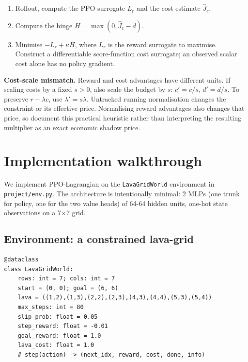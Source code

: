 \documentclass[11pt,oneside]{scrbook}
\begin{document}
\begin{tcolorbox}[colback=mintedbg, colframe=rlgray!50, title=\textbf{Algorithm: P3O (one update)}]
\begin{enumerate}[leftmargin=*]
  \item Rollout, compute the PPO surrogate $L_r$ and the cost estimate
        $\hat J_c$.
  \item Compute the hinge $H = \max(0, \hat J_c - d)$.
  \item Minimise $-L_r + \kappa H$, where $L_r$ is the reward surrogate to maximise. Construct a differentiable score-function cost surrogate; an observed scalar cost alone has no policy gradient.
\end{enumerate}
\end{tcolorbox}

\begin{pitfall}
\textbf{Cost-scale mismatch.} Reward and cost advantages have different
units. If scaling costs by a fixed $s>0$, also scale the budget by $s$:
$c'=c/s$, $d'=d/s$. To preserve $r-\lambda c$, use $\lambda'=s\lambda$.
Untracked running normalisation changes the constraint or its effective
price. Normalising reward advantages also changes that price, so document
this practical heuristic rather than interpreting the resulting multiplier
as an exact economic shadow price.

\end{pitfall}

\chapter{Implementation walkthrough}

We implement PPO-Lagrangian on the \texttt{LavaGridWorld} environment in
\verb|project/env.py|. The architecture is intentionally minimal: 2 MLPs (one
trunk for policy, one for the two value heads) of 64-64 hidden units, one-hot
state observations on a 7\(\times\)7 grid.

\section{Environment: a constrained lava-grid}

\begin{verbatim}
@dataclass
class LavaGridWorld:
    rows: int = 7; cols: int = 7
    start = (0, 0); goal = (6, 6)
    lava = ((1,2),(1,3),(2,2),(2,3),(4,3),(4,4),(5,3),(5,4))
    max_steps: int = 80
    slip_prob: float = 0.05
    step_reward: float = -0.01
    goal_reward: float = 1.0
    lava_cost: float = 1.0
    # step(action) -> (next_idx, reward, cost, done, info)
\end{verbatim}
\end{document}
